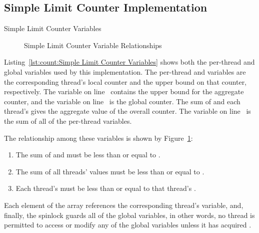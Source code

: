\subsection{Simple Limit Counter Implementation}
\label{sec:count:Simple Limit Counter Implementation}
\NoIndentAfterThis

\begin{listing}[tbp]

\caption{Simple Limit Counter Variables}
\label{lst:count:Simple Limit Counter Variables}
\end{listing}

\begin{figure}[tb]
\centering
{}
\caption{Simple Limit Counter Variable Relationships}
\label{fig:count:Simple Limit Counter Variable Relationships}
\end{figure}

\begin{lineref}
Listing~\ref{lst:count:Simple Limit Counter Variables}
shows both the per-thread and global variables used by this
implementation.
The per-thread  and  variables are the
corresponding thread's local counter and the upper bound on that
counter, respectively.
The  variable on
line~ contains the upper
bound for the aggregate counter, and the  variable
on line~ is the global counter.
The sum of  and each thread's  gives
the aggregate value of the overall counter.
The  variable on
line~ is the sum of all of the
per-thread  variables.
\end{lineref}
The relationship among these variables is shown by
Figure~\ref{fig:count:Simple Limit Counter Variable Relationships}:
\begin{enumerate}
\item	The sum of  and  must
	be less than or equal to .
\item	The sum of all threads'  values must be
	less than or equal to .
\item	Each thread's  must be less than or equal to
	that thread's .
\end{enumerate}

Each element of the  array references the corresponding
thread's  variable, and, finally, the 
spinlock guards all of the global variables, in other words, no thread
is permitted to access or modify any of the global variables unless it
has acquired .

